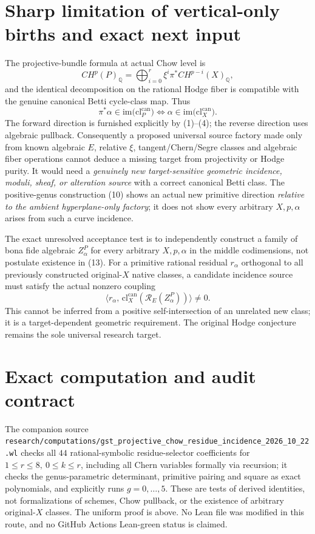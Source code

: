 \documentclass[11pt]{article}
\begin{document}
\section{Sharp limitation of vertical-only births and exact next input}
The projective-bundle formula at actual Chow level is
\[
 CH^p(P)_{\mathbb Q}
 =\bigoplus_{i=0}^r
   \xi^i\pi^*CH^{p-i}(X)_{\mathbb Q}, \tag{12}
\]
and the identical decomposition on the rational Hodge
fiber is compatible with the genuine canonical Betti
cycle-class map. Thus
\[
 \boxed{\pi^*\alpha \in
  \mathrm{im}\bigl(\mathrm{cl}^{\mathrm{can}}_P\bigr)
  \iff
  \alpha\in\mathrm{im}\bigl(\mathrm{cl}^{\mathrm{can}}_X\bigr).}
 \tag{13}
\]
The forward direction is furnished explicitly by (1)--(4);
the reverse direction uses algebraic pullback.
Consequently a proposed universal source factory made only from
known algebraic \(E\), relative \(\xi\), tangent/Chern/Segre
classes and algebraic fiber operations cannot deduce a missing
target from projectivity or Hodge purity. It would need a
\emph{genuinely new target-sensitive geometric incidence,
moduli, sheaf, or alteration source} with a correct canonical
Betti class. The positive-genus construction (10) shows an
actual new primitive direction \emph{relative to the ambient
hyperplane-only factory}; it does not show every arbitrary
\(X,p,\alpha\) arises from such a curve incidence.

The exact unresolved acceptance test is to independently
construct a family of bona fide algebraic \(Z_\alpha^P\)
for every arbitrary \(X,p,\alpha\) in the middle
codimensions, not postulate existence in (13).
For a primitive rational residual \(r_\alpha\) orthogonal
to all previously constructed original-\(X\) native
classes, a candidate incidence source must satisfy the
actual nonzero coupling
\[
 \langle r_\alpha,\,
    \mathrm{cl}_X^{\mathrm{can}}
       (\mathcal R_E(Z_\alpha^P))\rangle \ne0. \tag{14}
\]
This cannot be inferred from a positive self-intersection
of an unrelated new class; it is a target-dependent geometric
requirement. The original Hodge conjecture remains the sole
universal research target.

\section{Exact computation and audit contract}
The companion source
\texttt{research/computations/gst\_projective\_chow\_residue\_incidence\_2026\_10\_22.wl}
checks all \(44\) rational-symbolic residue-selector coefficients
for \(1\le r\le8,\ 0\le k\le r\), including all Chern variables
formally via recursion; it checks the genus-parametric determinant,
primitive pairing and square as exact polynomials, and explicitly
runs \(g=0,\ldots,5\). These are tests of derived identities,
not formalizations of schemes, Chow pullback, or the existence
of arbitrary original-\(X\) classes. The uniform proof is above.
No Lean file was modified in this route, and no GitHub Actions
Lean-green status is claimed.
\end{document}
